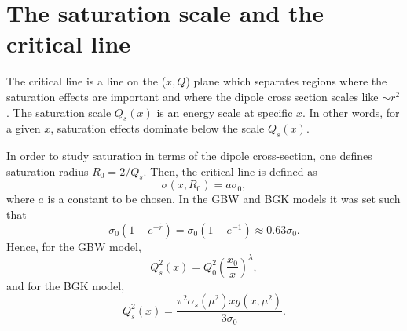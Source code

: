 \documentclass[11pt]{article}
\begin{document}
\section{The saturation scale and the critical line}
The critical line is a line on the ($x,Q$) plane which separates regions where the saturation effects are important and  where the dipole cross section scales like $\sim r^2$.
The saturation scale $Q_s(x)$ is an energy scale at specific $x$. In other words, for a given $x$, saturation effects dominate below the scale $Q_s(x)$.

In order to study saturation in terms of the dipole cross-section, one defines saturation radius $R_0=2/Q_s$.  
Then, the critical line is defined as \cite{gbs2006}
\begin{equation}
\sigma(x,R_0)=a \sigma_0,
\end{equation}
where $a$ is a constant to be chosen.
In the GBW and BGK models it was set such that 
\begin{equation}
\sigma_0\left(1-e^{-\hat{r}}\right)=\sigma_0 \left(1-e^{-1}\right)\approx 0.63 \sigma_0.
\end{equation}
Hence, for the GBW model,  
\begin{equation}
Q_s^2(x) =Q_0^2\left(\frac{x_0}{x}\right)^{\lambda},
\end{equation}
and for the BGK model,
\begin{equation}
Q^2_s(x)= \frac{\pi^2 \alpha_s(\mu^2) x g(x,\mu^2)}{3 \sigma_0}.
\end{equation}
\end{document}
